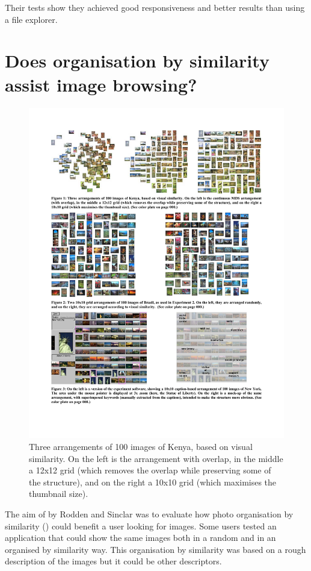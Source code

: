 Their tests show they achieved good responsiveness and better results than using a file explorer.


\section{Does organisation by similarity assist image browsing?} %
\label{sub:Rodden}
\begin{figure}[ht]
	\centering
		\includegraphics[width=\textwidth]{imgs/Rodden1}
	\caption{Three arrangements of 100 images of Kenya, based on visual similarity. On the left is the arrangement with overlap, in the middle a 12x12 grid (which removes the overlap while preserving some of the structure), and on the right a 10x10 grid (which maximises the thumbnail size).}
	\label{fig:Rodden1}
\end{figure}

The aim of \cite{Rodden:2001p731} by Rodden and Sinclar was to evaluate how photo organisation by similarity () could benefit a user looking for images. Some users tested an application that could show the same images both in a random and in an organised by similarity way. This organisation by similarity was based on a rough description of the images but it could be other descriptors.

